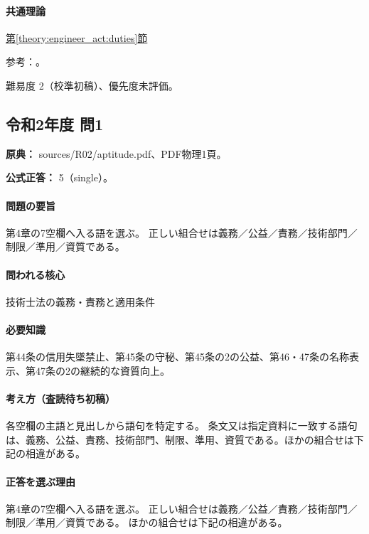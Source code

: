 \paragraph{共通理論} \hyperref[theory:engineer_act:duties]{第\ref*{theory:engineer_act:duties}節}

\par 参考：\cite{engineer_act_current}。

\par 難易度 2（校準初稿）、優先度未評価。

\subsection{令和2年度 問1}
\label{q:r02-reg-apt-01}

\noindent\textbf{原典：} sources/R02/aptitude.pdf、PDF物理1頁。

\textbf{公式正答：} 5（single）。

\paragraph{問題の要旨} 第4章の7空欄へ入る語を選ぶ。 正しい組合せは義務／公益／責務／技術部門／制限／準用／資質である。

\paragraph{問われる核心} 技術士法の義務・責務と適用条件

\paragraph{必要知識} 第44条の信用失墜禁止、第45条の守秘、第45条の2の公益、第46・47条の名称表示、第47条の2の継続的な資質向上。

\paragraph{考え方（査読待ち初稿）} 各空欄の主語と見出しから語句を特定する。 条文又は指定資料に一致する語句は、義務、公益、責務、技術部門、制限、準用、資質である。ほかの組合せは下記の相違がある。

\paragraph{正答を選ぶ理由} 第4章の7空欄へ入る語を選ぶ。 正しい組合せは義務／公益／責務／技術部門／制限／準用／資質である。 ほかの組合せは下記の相違がある。

